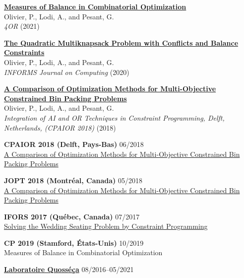 \documentclass{memoir}
\begin{document}
\begin{list}{}
  \Item \href{https://doi.org/10.1007/s10288-021-00486-x}{\textbf{Measures of Balance in Combinatorial Optimization}} \\
  Olivier, P., Lodi, A., and Pesant, G. \\
  \emph{4OR} (2021)

  \Item \href{https://doi.org/10.1287/ijoc.2020.0983}{\textbf{The Quadratic Multiknapsack Problem with Conflicts and Balance Constraints}} \\
  Olivier, P., Lodi, A., and Pesant, G. \\
  \emph{INFORMS Journal on Computing} (2020)

  \Item \href{https://doi.org/10.1007/978-3-319-93031-2_33}{\textbf{A Comparison of Optimization Methods for Multi-Objective Constrained Bin Packing Problems}} \\
  Olivier, P., Lodi, A., and Pesant, G. \\
  \emph{Integration of AI and OR Techniques in Constraint Programming, Delft, Netherlands, (CPAIOR 2018)} (2018)

  \pagebreak %

  \Item \textbf{CPAIOR 2018 (Delft, Pays-Bas)} \hfill 06/2018 \\
  \href{http://icaps18.icaps-conference.org/schedule}{A Comparison of Optimization Methods for Multi-Objective Constrained Bin Packing Problems}

  \Item \textbf{JOPT 2018 (Montréal, Canada)} \hfill 05/2018 \\
  \href{https://symposia.gerad.ca/jopt2018/en/schedule?slot_id=1374}{A Comparison of Optimization Methods for Multi-Objective Constrained Bin Packing Problems}

  \Item \textbf{IFORS 2017 (Québec, Canada)} \hfill 07/2017 \\
  \href{https://www.euro-online.org/conf/ifors2017/treat_abstract?paperid=1523}{Solving the Wedding Seating Problem by Constraint Programming}



  \Item \textbf{CP 2019 (Stamford, États-Unis)} \hfill 10/2019 \\
  Measures of Balance in Combinatorial Optimization



  \Item \href{https://www.polymtl.ca/labo-quosseca/en/members/alumni/doctoral-students}{\textbf{Laboratoire Quosséça}} \hfill 08/2016--05/2021


\end{list}
\end{document}
